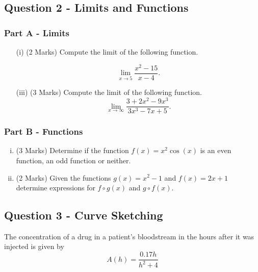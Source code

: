 ﻿ \documentclass[a4paper,12pt]{article}
\begin{document}
\newpage
\subsection*{Question 2 - Limits and Functions}
\subsubsection*{Part A - Limits}
\begin{enumerate}
	\item[(i)] (2 Marks)  Compute the limit of the following function.
	
	\[\lim_{x \to 5 } \frac{x^2-15}{x-4}.\]
		
		\bigskip
	
	\item[(iii)] (3 Marks) Compute the limit of the following function.
	\[ \lim_{x \to \infty } \frac{3 + 2x^2 - 9x^3 }{3x^3 - 7x + 5}. \]	
	
\end{enumerate}

\subsubsection*{Part B - Functions}
\begin{enumerate}[(i)]
	\item (3 Marks) Determine if the function $f(x) = x^2\cos(x)$ is an even function, an odd function or neither.
	\bigskip
	\item (2 Marks) Given the functions $g(x) = x^2-1$ and $f(x) = 2x+1$ determine expressions for $f \circ g(x)$ and $g \circ f(x)$.
\end{enumerate}
	\bigskip

\newpage
\subsection*{Question 3 - Curve Sketching}
The concentration of a drug in a patient's bloodstream in the hours
after it was injected is given by
\[ A(h) = \frac{0.17h}{h^2 +4} \]
	
\end{document}
